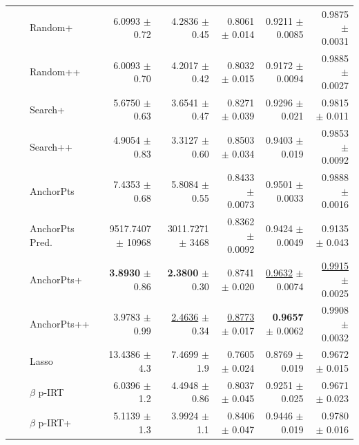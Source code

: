 \begin{longtable}{llp{}rrrrr}
 &  & Random+ & 6.0993 {\scriptsize $\pm$ 0.72} & 4.2836 {\scriptsize $\pm$ 0.45} & 0.8061 {\scriptsize $\pm$ 0.014} & 0.9211 {\scriptsize $\pm$ 0.0085} & 0.9875 {\scriptsize $\pm$ 0.0031} \\
 &  & Random++ & 6.0093 {\scriptsize $\pm$ 0.70} & 4.2017 {\scriptsize $\pm$ 0.42} & 0.8032 {\scriptsize $\pm$ 0.015} & 0.9172 {\scriptsize $\pm$ 0.0094} & 0.9885 {\scriptsize $\pm$ 0.0027} \\
 &  & Search+ & 5.6750 {\scriptsize $\pm$ 0.63} & 3.6541 {\scriptsize $\pm$ 0.47} & 0.8271 {\scriptsize $\pm$ 0.039} & 0.9296 {\scriptsize $\pm$ 0.021} & 0.9815 {\scriptsize $\pm$ 0.011} \\
 &  & Search++ & 4.9054 {\scriptsize $\pm$ 0.83} & 3.3127 {\scriptsize $\pm$ 0.60} & 0.8503 {\scriptsize $\pm$ 0.034} & 0.9403 {\scriptsize $\pm$ 0.019} & 0.9853 {\scriptsize $\pm$ 0.0092} \\
 &  & AnchorPts & 7.4353 {\scriptsize $\pm$ 0.68} & 5.8084 {\scriptsize $\pm$ 0.55} & 0.8433 {\scriptsize $\pm$ 0.0073} & 0.9501 {\scriptsize $\pm$ 0.0033} & 0.9888 {\scriptsize $\pm$ 0.0016} \\
 &  & AnchorPts Pred. & 9517.7407 {\scriptsize $\pm$ 10968} & 3011.7271 {\scriptsize $\pm$ 3468} & 0.8362 {\scriptsize $\pm$ 0.0092} & 0.9424 {\scriptsize $\pm$ 0.0049} & 0.9135 {\scriptsize $\pm$ 0.043} \\
 &  & AnchorPts+ & \textbf{3.8930} {\scriptsize $\pm$ 0.86} & \textbf{2.3800} {\scriptsize $\pm$ 0.30} & 0.8741 {\scriptsize $\pm$ 0.020} & \underline{0.9632} {\scriptsize $\pm$ 0.0074} & \underline{0.9915} {\scriptsize $\pm$ 0.0025} \\
 &  & AnchorPts++ & 3.9783 {\scriptsize $\pm$ 0.99} & \underline{2.4636} {\scriptsize $\pm$ 0.34} & \underline{0.8773} {\scriptsize $\pm$ 0.017} & \textbf{0.9657} {\scriptsize $\pm$ 0.0062} & 0.9908 {\scriptsize $\pm$ 0.0032} \\
 &  & Lasso & 13.4386 {\scriptsize $\pm$ 4.3} & 7.4699 {\scriptsize $\pm$ 1.9} & 0.7605 {\scriptsize $\pm$ 0.024} & 0.8769 {\scriptsize $\pm$ 0.019} & 0.9672 {\scriptsize $\pm$ 0.015} \\
 &  & $\beta$ p-IRT & 6.0396 {\scriptsize $\pm$ 1.2} & 4.4948 {\scriptsize $\pm$ 0.86} & 0.8037 {\scriptsize $\pm$ 0.045} & 0.9251 {\scriptsize $\pm$ 0.025} & 0.9671 {\scriptsize $\pm$ 0.023} \\
 &  & $\beta$ p-IRT+ & 5.1139 {\scriptsize $\pm$ 1.3} & 3.9924 {\scriptsize $\pm$ 1.1} & 0.8406 {\scriptsize $\pm$ 0.047} & 0.9446 {\scriptsize $\pm$ 0.019} & 0.9780 {\scriptsize $\pm$ 0.016} \\

\end{longtable}
